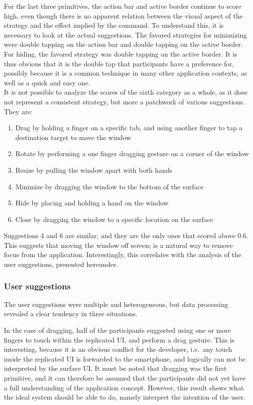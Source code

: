 For the last three primitives, the action bar and active border continue to score high, even though there is no apparent relation between the visual aspect of the strategy and the effect implied by the command.
To understand this, it is necessary to look at the actual suggestions.
The favored strategies for minimizing were double tapping on the action bar and double tapping on the active border.
For hiding, the favored strategy was double tapping on the active border.
It is thus obvious that it is the double tap that participants have a preference for, possibly because it is a common technique in many other application contexts, as well as a quick and easy one.
\\
\linebreak
\label{other} It is not possible to analyze the scores of the sixth category as a whole, as it does not represent a consistent strategy, but more a patchwork of various suggestions. They are:
\begin{enumerate}
\item Drag by holding a finger on a specific tab, and using another finger to tap a destination target to move the window
\item Rotate by performing a one finger dragging gesture on a corner of the window
\item Resize by pulling the window apart with both hands
\item Minimize by dragging the window to the bottom of the surface
\item Hide by placing and holding a hand on the window
\item Close by dragging the window to a specific location on the surface
\end{enumerate}
Suggestions 4 and 6 are similar, and they are the only ones that scored above 0.6.
This suggests that moving the window off screen; is a natural way to remove focus from the application.
Interestingly, this correlates with the analysis of the user suggestions, presented hereunder.

\subsubsection{User suggestions}

The user suggestions were multiple and heterogeneous, but data processing revealed a clear tendency in three situations.

In the case of dragging, half of the participants suggested using one or more fingers to touch within the replicated UI, and perform a drag gesture.
This is interesting, because it is an obvious conflict for the developer, i.e.\ any touch inside the replicated UI is forwarded to the smartphone, and logically can not be interpreted by the surface UI.
It must be noted that dragging was the first primitive, and it can therefore be assumed that the participants did not yet have a full understanding of the application concept.
However, this result shows what the ideal system should be able to do, namely interpret the intention of the user.

